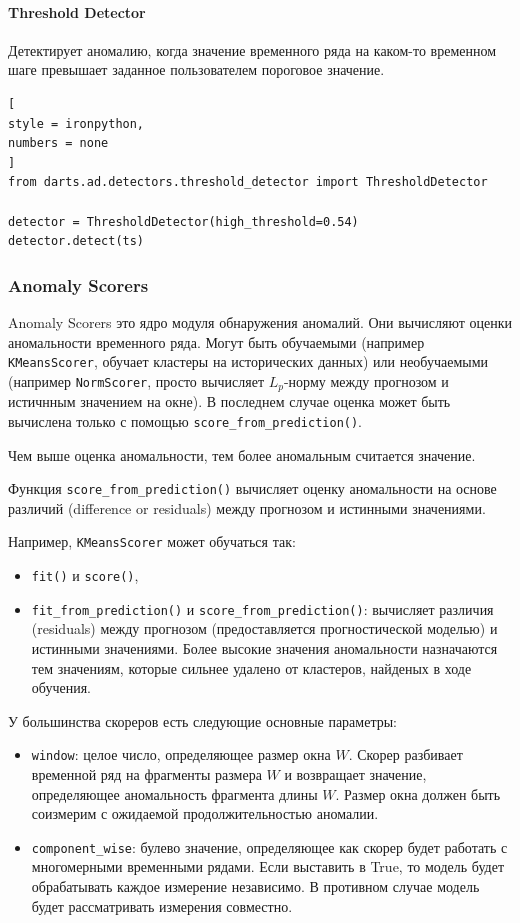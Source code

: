 \documentclass[%
	11pt,
	a4paper,
	utf8,
		]{article}
\begin{document}
\paragraph{Threshold Detector} Детектирует аномалию, когда значение временного ряда на каком-то временном шаге превышает заданное пользователем пороговое значение.
\begin{lstlisting}[
style = ironpython,
numbers = none
]
from darts.ad.detectors.threshold_detector import ThresholdDetector

detector = ThresholdDetector(high_threshold=0.54)
detector.detect(ts)
\end{lstlisting}

\subsubsection{Anomaly Scorers}

Anomaly Scorers это ядро модуля обнаружения аномалий. Они вычисляют оценки аномальности временного ряда. Могут быть обучаемыми (например \verb|KMeansScorer|, обучает кластеры на исторических данных) или необучаемыми (например \verb|NormScorer|, просто вычисляет $ L_p $-норму между прогнозом и истичнным значением на окне). В последнем случае оценка может быть вычислена только с помощью \verb|score_from_prediction()|.

Чем выше оценка аномальности, тем более аномальным считается значение.

Функция \verb|score_from_prediction()| вычисляет оценку аномальности на основе различий (difference or residuals) между прогнозом и истинными значениями. 

Например, \verb|KMeansScorer| может обучаться так:
\begin{itemize}
	\item \verb|fit()| и \verb|score()|,
	
	\item \verb|fit_from_prediction()| и \verb|score_from_prediction()|: вычисляет различия (residuals) между прогнозом (предоставляется прогностической моделью) и истинными значениями. Более высокие значения аномальности назначаются тем значениям, которые сильнее удалено от кластеров, найденых в ходе обучения.
\end{itemize}

У большинства скореров есть следующие основные параметры:
\begin{itemize}
	\item \verb|window|: целое число, определяющее размер окна $ W $. Скорер разбивает временной ряд на фрагменты размера $ W $ и возвращает значение, определяющее аномальность фрагмента длины $ W $. Размер окна должен быть соизмерим с ожидаемой продолжительностью аномалии.
	
	\item \verb|component_wise|: булево значение, определяющее как скорер будет работать с многомерными временными рядами. Если выставить в True, то модель будет обрабатывать каждое измерение независимо. В противном случае модель будет рассматривать измерения совместно. 
\end{itemize}
\end{document}
